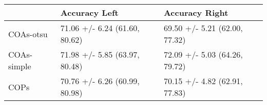\begin{tabular}{lll}
\toprule
{} &                  Accuracy Left &                 Accuracy Right \\
\midrule
COAs-otsu   &  71.06 +/- 6.24 (61.60, 80.62) &  69.50 +/- 5.21 (62.00, 77.32) \\
COAs-simple &  71.98 +/- 5.85 (63.97, 80.48) &  72.09 +/- 5.03 (64.26, 79.72) \\
COPs        &  70.76 +/- 6.26 (60.99, 80.98) &  70.15 +/- 4.82 (62.91, 77.83) \\
\bottomrule
\end{tabular}
